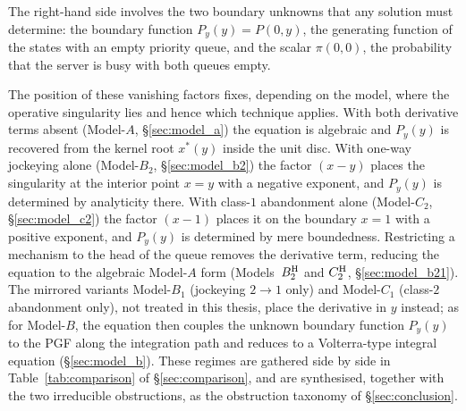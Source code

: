 The right-hand side involves the two boundary unknowns that any solution must determine: the boundary function $P_y(y)=P(0,y)$, the generating function of the states with an empty priority queue, and the scalar $\pi(0,0)$, the probability that the server is busy with both queues empty.

The position of these vanishing factors fixes, depending on the model, where the operative singularity lies and hence which technique applies. With both derivative terms absent (Model-$A$, \S\ref{sec:model_a}) the equation is algebraic and $P_y(y)$ is recovered from the kernel root $x^*(y)$ inside the unit disc. With one-way jockeying alone (Model-$B_2$, \S\ref{sec:model_b2}) the factor $(x-y)$ places the singularity at the interior point $x=y$ with a negative exponent, and $P_y(y)$ is determined by analyticity there. With class-$1$ abandonment alone (Model-$C_2$, \S\ref{sec:model_c2}) the factor $(x-1)$ places it on the boundary $x=1$ with a positive exponent, and $P_y(y)$ is determined by mere boundedness. Restricting a mechanism to the head of the queue removes the derivative term, reducing the equation to the algebraic Model-$A$ form (Models~$B_2^{\mathrm{H}}$ and $C_2^{\mathrm{H}}$, \S\ref{sec:model_b21}). The mirrored variants Model-$B_1$ (jockeying $2\to1$ only) and Model-$C_1$ (class-$2$ abandonment only), not treated in this thesis, place the derivative in $y$ instead; as for Model-$B$, the equation then couples the unknown boundary function $P_y(y)$ to the PGF along the integration path and reduces to a Volterra-type integral equation (\S\ref{sec:model_b}). These regimes are gathered side by side in Table~\ref{tab:comparison} of \S\ref{sec:comparison}, and are synthesised, together with the two irreducible obstructions, as the obstruction taxonomy of \S\ref{sec:conclusion}.

